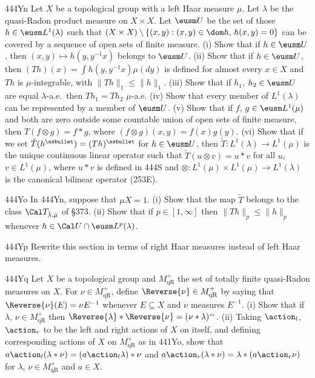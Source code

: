 {\spheader 444Yn Let $X$ be a topological group with a left Haar measure
$\mu$.   Let $\lambda$ be the quasi-Radon product measure on
$X\times X$.   Let $\eusm U$ be the set of those
$h\in\eusm L^1(\lambda)$ such
that $(X\times X)\setminus\{(x,y):(x,y)\in\dom h,\,h(x,y)=0\}$ can be
covered by a sequence of open sets of finite measure.
(i) Show that if $h\in\eusm U$, then $(x,y)\mapsto h(y,y^{-1}x)$ belongs
to $\eusm U$.   
(ii) Show that if
$h\in\eusm U$, then $(Th)(x)=\int h(y,y^{-1}x)\mu(dy)$ is defined for
almost every $x\in X$ and $Th$
is $\mu$-integrable, with $\|Th\|_1\le\|h\|_1$.   
(iii) Show that if $h_1$, $h_2\in\eusm U$ are equal
$\lambda$-a.e.\ then $Th_1=Th_2\,\,\mu$-a.e.
(iv) Show that every
member of $L^1(\lambda)$ can be represented by a member of $\eusm U$.
(v) Show that if $f$, $g\in\eusm L^1(\mu)$ and both are
zero outside some countable union of open sets of finite measure, then
$T(f\otimes g)=f*g$, where $(f\otimes g)(x,y)=f(x)g(y)$.
(vi) Show that
if we set $\tilde T(h^{\ssbullet})=(Th)^{\ssbullet}$ for $h\in\eusm U$,
then $\tilde T:L^1(\lambda)\to L^1(\mu)$ is the unique continuous linear
operator such that $\tilde T(u\otimes v)=u*v$ for all $u$,
$v\in L^1(\mu)$, where $u*v$ is defined in 444S and
$\otimes:L^1(\mu)\times L^1(\mu)\to L^1(\lambda)$ is the canonical
bilinear operator (253E).

\spheader 444Yo In 444Yn, suppose that $\mu X=1$.   (i) Show that the
map $\tilde T$ belongs to the
class $\Cal T_{\bar\lambda,\bar\mu}$ of \S373.   (ii) Show that if
$p\in[1,\infty]$ then $\|Th\|_p\le\|h\|_p$ whenever
$h\in\Cal U\cap\eusm L^p(\lambda)$.

\spheader 444Yp Rewrite this section in terms of right Haar measures
instead of left Haar measures.

\spheader 444Yq
Let $X$ be a topological group and $M_{\text{qR}}^+$ the set of totally
finite quasi-Radon measures on $X$.   For $\nu\in M_{\text{qR}}^+$,
define $\Reverse{\nu}\in M_{\text{qR}}^+$ by
saying that $\Reverse{\nu}(E)=\nu E^{-1}$ whenever $E\subseteq X$ and
$\nu$ measures $E^{-1}$.   (i) Show that if $\lambda$,
$\nu\in M_{\text{qR}}^+$ then
$\Reverse{\lambda}*\Reverse{\nu}=(\nu*\lambda)\ssplrarrow$.
(ii) Taking $\action_l$, $\action_r$ to be the left and right actions of
$X$ on itself, and defining corresponding actions of $X$ on
$M_{\text{qR}}^+$ as in 441Yo, show that
$a\action_l(\lambda*\nu)=(a\action_l\lambda)*\nu$ and
$a\action_r(\lambda*\nu)=\lambda*(a\action_r\nu)$ for $\lambda$,
$\nu\in M_{\text{qR}}^+$ and $a\in X$.
}%

